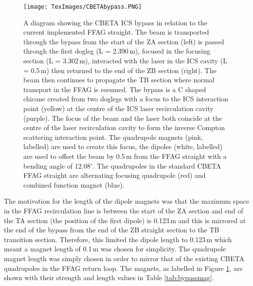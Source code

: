 \documentclass[11pt]{article}
\begin{document}
\begin{figure}[H]
\centering
\texttt{[image: TexImages/CBETAbypass.PNG]}
\caption{\label{fig:bypassdiag} A diagram showing the CBETA ICS bypass in relation to the current implemented FFAG straight. The beam is transported through the bypass from the start of the ZA section (left) is passed through the first dogleg (L = 2.390\,m), focused in the focusing section (L = 3.302\,m), interacted with the laser in the ICS cavity (L = 0.5\,m) then returned to the end of the ZB section (right). The beam then continues to propagate the TB section where normal transport in the FFAG is resumed. The bypass is a C shaped chicane created from two doglegs with a focus to the ICS interaction point (yellow) at the centre of the ICS laser recirculation cavity (purple). The focus of the beam and the laser both coincide at the centre of the laser recirculation cavity to form the inverse Compton scattering interaction point. The quadrupole magnets (pink, labelled) are used to create this focus, the dipoles (white, labelled) are used to offset the beam by 0.5\,m from the FFAG straight with a bending angle of 12.08$^{\circ}$. The quadrupoles in the standard CBETA FFAG straight are alternating focusing quadrupole (red) and combined function magnet (blue).}
\end{figure}

The motivation for the length of the dipole magnets was that the maximum space in the FFAG recirculation line is between the start of the ZA section and end of the TA section (the position of the first dipole) is 0.123\,m and this is mirrored at the end of the bypass from the end of the ZB straight section to the TB transition section. Therefore, this limited the dipole length to 0.123\,m which meant a magnet length of 0.1\,m was chosen for simplicity. The quadrupole magnet length was simply chosen in order to mirror that of the existing CBETA quadrupoles in the FFAG return loop. The magnets, as labelled in Figure \ref{fig:bypassdiag}, are shown with their strength and length values in Table \ref{tab:bypassmag}.
\end{document}
